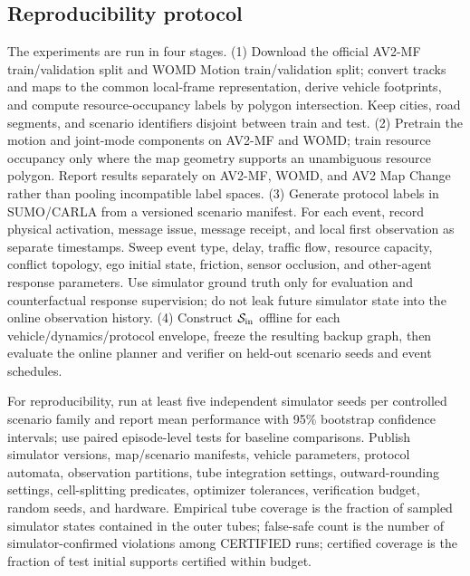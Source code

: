 \documentclass[letterpaper]{article} %
\begin{document}
\enlargethispage{4\baselineskip}
\subsection{Reproducibility protocol}
\label{app:reproducibility}
\small
The experiments are run in four stages. (1) Download the official AV2-MF
train/validation split and WOMD Motion train/validation split; convert tracks
and maps to the common local-frame representation, derive vehicle footprints,
and compute resource-occupancy labels by polygon intersection. Keep cities,
road segments, and scenario identifiers disjoint between train and test.
(2) Pretrain the motion and joint-mode components on AV2-MF and WOMD; train
resource occupancy only where the map geometry supports an unambiguous
resource polygon. Report results separately on AV2-MF, WOMD, and AV2 Map
Change rather than pooling incompatible label spaces. (3) Generate protocol
labels in SUMO/CARLA from a versioned scenario manifest. For each event,
record physical activation, message issue, message receipt, and local first
observation as separate timestamps. Sweep event type, delay, traffic flow,
resource capacity, conflict topology, ego initial state, friction, sensor
occlusion, and other-agent response parameters. Use simulator ground truth
only for evaluation and counterfactual response supervision; do not leak
future simulator state into the online observation history. (4) Construct
$\mathcal S_{\rm in}$ offline for each vehicle/dynamics/protocol envelope,
freeze the resulting backup graph, then evaluate the online planner and
verifier on held-out scenario seeds and event schedules.

For reproducibility, run at least five independent simulator seeds per
controlled scenario family and report mean performance with 95\% bootstrap
confidence intervals; use paired episode-level tests for baseline comparisons.
Publish simulator versions, map/scenario manifests, vehicle parameters, protocol automata, observation partitions, tube integration settings, outward-rounding settings, cell-splitting predicates, optimizer tolerances, verification budget, random seeds, and hardware. Empirical tube coverage is the fraction of sampled simulator states contained in the outer tubes; false-safe count is the number of simulator-confirmed violations among CERTIFIED runs; certified coverage is the fraction of test initial supports certified within budget.



\end{document}
